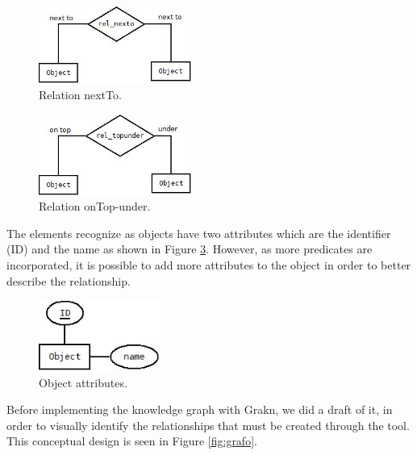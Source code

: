 \begin{figure}[H]
    \centering
    \includegraphics[width=5cm]{figures/nextto.jpg}
    \caption{Relation nextTo.}
    \label{fig:nexto}
\end{figure}

\begin{figure}[H]
    \centering
    \includegraphics[width=5cm]{figures/topunder.jpg}
    \caption{Relation onTop-under.}
    \label{fig:topUnder}
\end{figure}

The elements recognize as objects have two attributes which are the identifier (ID) and the name as shown in Figure \ref{fig:object}. However, as more predicates are incorporated, it is possible to add more attributes to the object in order to better describe the relationship.


\begin{figure}[H]
    \centering
    \includegraphics[width=4cm]{figures/object.jpg}
    \caption{Object attributes.}
    \label{fig:object}
\end{figure}

Before implementing the knowledge graph with Grakn, we did a draft of it, in order to visually identify the relationships that must be created through the tool. This conceptual design is seen in Figure \ref{fig:grafo}.

